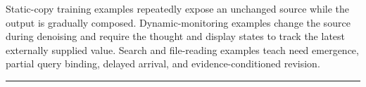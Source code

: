 Static-copy training examples repeatedly expose an unchanged source while the output is gradually composed. Dynamic-monitoring examples change the source during denoising and require the thought and display states to track the latest externally supplied value. Search and file-reading examples teach need emergence, partial query binding, delayed arrival, and evidence-conditioned revision.
\par\vspace{3pt}
\noindent\rule{\columnwidth}{0.5pt}
\par